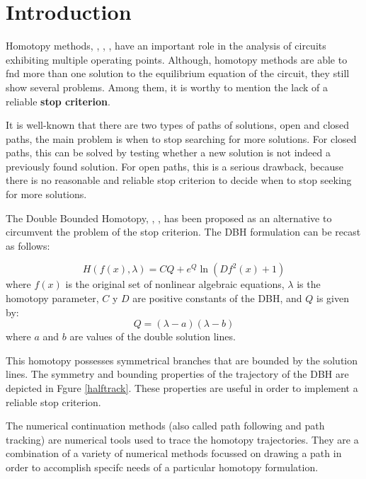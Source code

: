 \documentclass[conference]{IEEEtran}
\begin{document}
\section{Introduction}

Homotopy methods, 
\cite{homo_ArtificialP}, \cite{homo_DWolfMulti}, \cite{cont_leu1}, have an
important role in the analysis of
circuits exhibiting multiple operating points.
Although, homotopy methods are able to fnd more than one solution to
the equilibrium equation of the circuit, they still show several
problems. Among them, it is worthy to mention the lack of a reliable {\bf
stop criterion}. 

It is well-known that there are two types of paths of solutions,
open and closed paths, the main problem is when to stop searching for
more solutions. For closed paths, this can be solved by testing whether
a new solution is not indeed a previously found solution. For
open paths, this is a serious
drawback, because there is no reasonable and reliable stop criterion
to decide when to stop seeking for more solutions.

The Double Bounded Homotopy,
\cite{homo_iscas05}, \cite{homo_iberchip03}, has been proposed
as an alternative to circumvent the problem
of the stop criterion. The DBH formulation can be recast as follows:

\begin{equation}
H(f(x),\lambda)=CQ+e^Q\ln(Df^2(x)+1)
\label{fx}
\end{equation}
where $f(x)$ is the original set of nonlinear algebraic equations,
$\lambda$ is the homotopy
parameter,
$C$ y $D$ are positive constants of the DBH, and $Q$ is given by:
\begin{displaymath}
Q=(\lambda-a)(\lambda-b)
\end{displaymath}
where $a$ and $b$ are values of the double solution lines.

This homotopy possesses symmetrical branches that are bounded
by the solution lines. The symmetry and
bounding properties \cite{homo_dlimite} of the trajectory of the DBH are
depicted in
Fgure \ref{halftrack}. These properties are
useful in order to implement a reliable stop criterion. 

The numerical continuation methods (also called path following
and path tracking) are numerical tools used to
trace the homotopy trajectories. They are a combination of
a variety of numerical methods focussed on drawing 
a path in order to accomplish specifc needs
of a particular homotopy formulation. 
\end{document}
